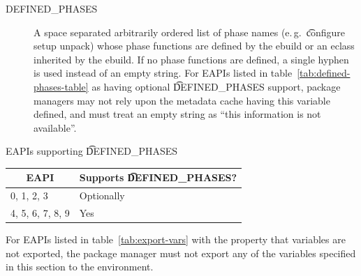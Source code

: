 \begin{description}
\item[DEFINED_PHASES]  A space separated arbitrarily ordered list
    of phase names (e.\,g.\ \t{configure setup unpack}) whose phase functions are defined by the
    ebuild or an eclass inherited by the ebuild. If no phase functions are defined, a single hyphen
    is used instead of an empty string. For EAPIs listed in table~\ref{tab:defined-phases-table}
    as having optional \t{DEFINED_PHASES} support, package managers may not rely upon the metadata
    cache having this variable defined, and must treat an empty string as ``this information is not
    available''.
\end{description}


\begin{centertable}{EAPIs supporting \t{DEFINED_PHASES}}
    \label{tab:defined-phases-table}
    \begin{tabular}{ll}
      \toprule
      \multicolumn{1}{c}{\textbf{EAPI}} &
      \multicolumn{1}{c}{\textbf{Supports \t{DEFINED_PHASES}?}} \\
      \midrule
      0, 1, 2, 3        & Optionally \\
      4, 5, 6, 7, 8, 9  & Yes        \\
      \bottomrule
    \end{tabular}
\end{centertable}

For EAPIs listed in table~\ref{tab:export-vars} with the property that variables are not exported,
the package manager must not export any of the variables specified in this section to the
environment.


